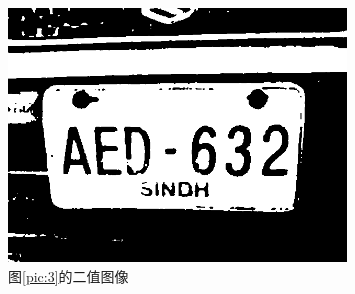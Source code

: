 \documentclass[a4paper]{ctexart}
\begin{document}
\begin{spacing}{1.35}
	\begin{figure}[htbp]
		\centering
		\includegraphics[width=0.8\textwidth]{figure/3mask_2_1.png}
		\caption{图\ref{pic:3}的二值图像}\label{fig:3mask}
	\end{figure}


\end{spacing}
\end{document}
